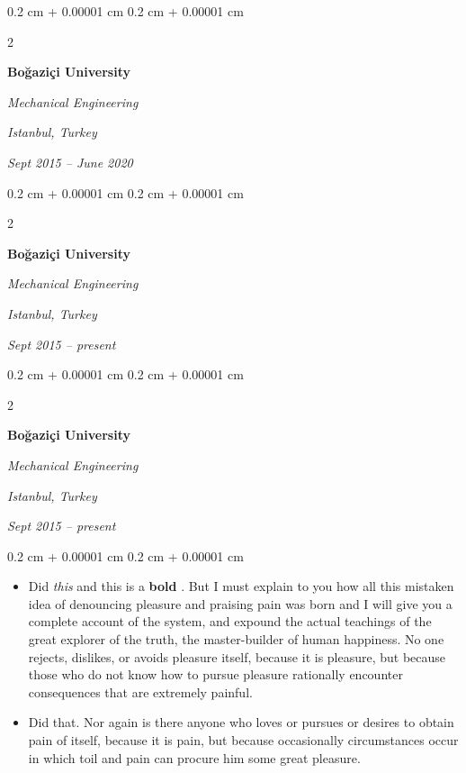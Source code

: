 \documentclass[10pt, letterpaper]{article}
\newenvironment{highlights}{
    \begin{itemize}[
        topsep=0.10 cm,
        parsep=0.10 cm,
        partopsep=0pt,
        itemsep=0pt,
        leftmargin=0.4 cm + 10pt
    ]
}{
    \end{itemize}
} %
\newenvironment{onecolentry}{
    \begin{adjustwidth}{
        0.2 cm + 0.00001 cm
    }{
        0.2 cm + 0.00001 cm
    }
}{
    \end{adjustwidth}
} %
\newenvironment{twocolentry}[2][]{
    \onecolentry
    \def\secondColumn{#2}
    \setcolumnwidth{\fill, 4.5 cm}
    \begin{paracol}{2}
}{
    \switchcolumn \raggedleft \secondColumn
    \end{paracol}
    \endonecolentry
} %
\let\hrefWithoutArrow\href
\renewcommand{\href}[2]{\hrefWithoutArrow{#1}{\ifthenelse{\equal{#2}{}}{ }{#2 }\raisebox{.15ex}{\footnotesize \faExternalLink*}}}
\begin{document}
        \vspace{0.2 cm}

        \begin{twocolentry}{
        \textit{Istanbul, Turkey}    
            
        \textit{Sept 2015 – June 2020}}
            \textbf{Boğaziçi University}

            \textit{Mechanical Engineering}
        \end{twocolentry}



        \vspace{0.2 cm}

        \begin{twocolentry}{
        \textit{Istanbul, Turkey}    
            
        \textit{Sept 2015 – present}}
            \textbf{Boğaziçi University}

            \textit{Mechanical Engineering}
        \end{twocolentry}



        \vspace{0.2 cm}

        \begin{twocolentry}{
        \textit{Istanbul, Turkey}    
            
        \textit{Sept 2015 – present}}
            \textbf{Boğaziçi University}

            \textit{Mechanical Engineering}
        \end{twocolentry}

        \vspace{0.10 cm}
        \begin{onecolentry}
            \begin{highlights}
                \item Did \textit{this} and this is a \textbf{bold} \href{https://example.com}{link}. But I must explain to you how all this mistaken idea of denouncing pleasure and praising pain was born and I will give you a complete account of the system, and expound the actual teachings of the great explorer of the truth, the master-builder of human happiness. No one rejects, dislikes, or avoids pleasure itself, because it is pleasure, but because those who do not know how to pursue pleasure rationally encounter consequences that are extremely painful.
                \item Did that. Nor again is there anyone who loves or pursues or desires to obtain pain of itself, because it is pain, but because occasionally circumstances occur in which toil and pain can procure him some great pleasure.
            \end{highlights}
        \end{onecolentry}
\end{document}
